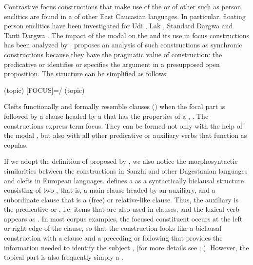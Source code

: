 Contrastive focus constructions that make use of the  or of other  such as person enclitics are found in a  of other East Caucasian languages. In particular, floating person enclitics have been investigated for Udi \citep{Harris2001, Harris2002}, Lak \citep{Kazenin2002}, Standard Dargwa \citep{Xajdakov1986} and Tanti Dargwa \citep{Sumbatova2013}. The impact of the modal  on the  and its use in focus constructions has been analyzed by \citet{ForkerSubmittedc}. \citet{Kazenin2002} proposes an analysis of such constructions as synchronic  constructions because they have the pragmatic value of  construction: the predicative  or  identifies or specifies the argument in a presupposed open proposition. The structure can be simplified as follows:
%
\begin{exe}
	\ex	(topic) [FOCUS]=/ (topic) \label{ex:topic focus particlecopula topic}
\end{exe}

Clefts functionally and formally resemble  clauses () when the focal part is followed by a clause headed by a  that has the properties of a  ,  . The constructions express term focus. They can be formed not only with the help of the modal , but also with all other predicative  or auxiliary verbs that function as copulas.

If we adopt the definition of  proposed by \citet{Lambrecht2001}, we also notice the morphosyntactic similarities between the constructions in Sanzhi and other Dagestanian languages and clefts in European languages.  defines a  as a syntactically biclausal structure consisting of two , that is, a main clause headed by an auxiliary, and a subordinate clause that is a (free)  or relative-like clause. Thus, the auxiliary is the predicative  or , i.e. items that are also used in  clauses, and the lexical verb appears as . In most corpus examples, the focused constituent occurs at the left or right edge of the clause, so that the construction looks like a biclausal construction with a  clause and a preceding or following  that provides the information needed to identify the  subject ,   (for more details see \citealt{Kazenin2002}; \citealt{Forker2016a}). However, the topical part is also frequently simply a  .

